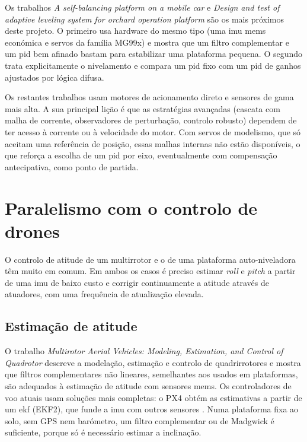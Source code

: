 Os trabalhos \textit{A self-balancing platform on a mobile car} \cite{tawfeeq2022} e \textit{Design and test of adaptive leveling system for orchard operation platform} \cite{guo2025} são os mais próximos deste projeto. O primeiro usa hardware do mesmo tipo (uma \gls{imu} \gls{mems} económica e servos da família MG99x) e mostra que um filtro complementar e um \gls{pid} bem afinado bastam para estabilizar uma plataforma pequena. O segundo trata explicitamente o nivelamento e compara um \gls{pid} fixo com um \gls{pid} de ganhos ajustados por lógica difusa.

Os restantes trabalhos usam motores de acionamento direto e sensores de gama mais alta. A sua principal lição é que as estratégias avançadas (cascata com malha de corrente, observadores de perturbação, controlo robusto) dependem de ter acesso à corrente ou à velocidade do motor. Com servos de modelismo, que só aceitam uma referência de posição, essas malhas internas não estão disponíveis, o que reforça a escolha de um \gls{pid} por eixo, eventualmente com compensação antecipativa, como ponto de partida.

\section{Paralelismo com o controlo de drones}
\label{sec:drones}
O controlo de atitude de um multirrotor e o de uma plataforma auto-niveladora têm muito em comum. Em ambos os casos é preciso estimar \textit{roll} e \textit{pitch} a partir de uma \gls{imu} de baixo custo e corrigir continuamente a atitude através de atuadores, com uma frequência de atualização elevada.

\subsection{Estimação de atitude}
O trabalho \textit{Multirotor Aerial Vehicles: Modeling, Estimation, and Control of Quadrotor} \cite{mahony2012} descreve a modelação, estimação e controlo de quadrirrotores e mostra que filtros complementares não lineares, semelhantes aos usados em plataformas, são adequados à estimação de atitude com sensores \gls{mems}. Os controladores de voo atuais usam soluções mais completas: o PX4 obtém as estimativas a partir de um \gls{ekf} (EKF2), que funde a \gls{imu} com outros sensores \cite{px4ctrl}. Numa plataforma fixa ao solo, sem GPS nem barómetro, um filtro complementar ou de Madgwick é suficiente, porque só é necessário estimar a inclinação.

